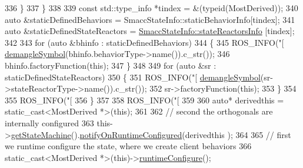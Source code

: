 \begin{DoxyCode}
{{{{336           \}
337         \}
338 
339         \textcolor{keyword}{const} std::type\_info *tindex = &(\textcolor{keyword}{typeid}(MostDerived));
340         \textcolor{keyword}{auto} &staticDefinedBehaviors = SmaccStateInfo::staticBehaviorInfo[tindex];
341         \textcolor{keyword}{auto} &staticDefinedStateReactors = \hyperlink{classsmacc_1_1introspection_1_1SmaccStateInfo_abd1d6ca5060c87f6bd11fde3e5b2ac4d}{SmaccStateInfo::stateReactorsInfo}
      [tindex];
342 
343         \textcolor{keywordflow}{for} (\textcolor{keyword}{auto} &bhinfo : staticDefinedBehaviors)
344         \{
345           ROS\_INFO(\textcolor{stringliteral}{"[%
      \hyperlink{namespacesmacc_1_1introspection_a2f495108db3e57604d8d3ff5ef030302}{demangleSymbol}(bhinfo.behaviorType->name()).c\_str());
346           bhinfo.factoryFunction(\textcolor{keyword}{this});
347         \}
348 
349         \textcolor{keywordflow}{for} (\textcolor{keyword}{auto} &sr : staticDefinedStateReactors)
350         \{
351           ROS\_INFO(\textcolor{stringliteral}{"[%
      \hyperlink{namespacesmacc_1_1introspection_a2f495108db3e57604d8d3ff5ef030302}{demangleSymbol}(sr->stateReactorType->name()).c\_str());
352           sr->factoryFunction(\textcolor{keyword}{this});
353         \}
354 
355         ROS\_INFO(\textcolor{stringliteral}{"[%
356       \}
357 
358       ROS\_INFO(\textcolor{stringliteral}{"[%
359 
360       \textcolor{keyword}{auto}* derivedthis = \textcolor{keyword}{static\_cast<}MostDerived *\textcolor{keyword}{>}(\textcolor{keyword}{this});
361       
362       \textcolor{comment}{// second the orthogonals are internally configured}
363       this->\hyperlink{classsmacc_1_1SmaccState_afc39f8e0ca4001b2159a100da2fccd0e}{getStateMachine}().\hyperlink{classsmacc_1_1ISmaccStateMachine_a7377ca0f79289fdc27f9ed3ff6e67263}{notifyOnRuntimeConfigured}(derivedthis
      );
364 
365       \textcolor{comment}{// first we runtime configure the state, where we create client behaviors}
366       \textcolor{keyword}{static\_cast<}MostDerived *\textcolor{keyword}{>}(\textcolor{keyword}{this})->\hyperlink{classsmacc_1_1SmaccState_a6995704a0232e24f4c38250302c0a01f}{runtimeConfigure}();
}}}}}}}}
\end{DoxyCode}
